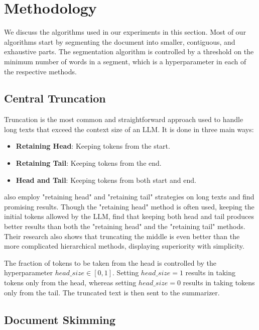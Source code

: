 \section{Methodology}
\label{sec:methodology}

We discuss the algorithms used in our experiments in this section.
Most of our algorithms start by segmenting the document into smaller, contiguous, and
exhaustive parts.
The segmentation algorithm is controlled by a threshold on the minimum number of words
in a segment, which is a hyperparameter in each of the respective methods.


\subsection{Central Truncation}
\label{method:truncation}

Truncation is the most common and straightforward approach used to handle long texts
that exceed the context size of an LLM.
It is done in three main ways:

\begin{itemize}
	\item \textbf{Retaining Head}: Keeping tokens from the start.
	\item \textbf{Retaining Tail}: Keeping tokens from the end.
	\item \textbf{Head and Tail}: Keeping tokens from both start and end.
\end{itemize}

\citet{worsham-kalita-2018-genre} also employ "retaining head" and "retaining tail"
strategies on long texts and find promising results.
Though the "retaining head" method is often used, keeping the initial tokens allowed by
the LLM, \citet{sun2019fine} find that keeping both head and tail produces better results
than both the "retaining head" and the "retaining tail" methods.
Their research also shows that truncating the middle is even better than the more
complicated hierarchical methods, displaying superiority with simplicity.

The fraction of tokens to be taken from the head is controlled by the hyperparameter
$head\_size \in [0, 1]$.
Setting $head\_size = 1$ results in taking tokens only from the head, whereas
setting $head\_size = 0$ results in taking tokens only from the tail.
The truncated text is then sent to the summarizer.


\subsection{Document Skimming}
\label{method:skimming}

